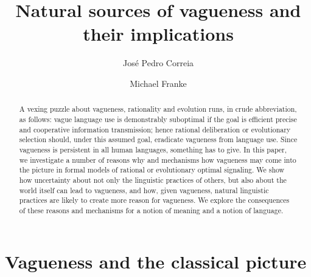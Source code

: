 \documentclass[a4paper]{article}
\begin{document}
\title{Natural sources of vagueness and their implications}
\author{Jos\'e Pedro Correia \and Michael Franke}
\date{}

\maketitle

\begin{abstract}
A vexing puzzle about vagueness, rationality and evolution runs, in crude abbreviation, as follows: vague language use is demonstrably suboptimal if the goal is efficient precise and cooperative information transmission; hence rational deliberation or evolutionary selection should, under this assumed goal, eradicate vagueness from language use.
Since vagueness is persistent in all human languages, something has to give.
In this paper, we investigate a number of reasons why and mechanisms how vagueness may come into the picture in formal models of rational or evolutionary optimal signaling.
We show how uncertainty about not only the linguistic practices of others, but also about the world itself can lead to vagueness, and how, given vagueness, natural linguistic practices are likely to create more reason for vagueness.
We explore the consequences of these reasons and mechanisms for a notion of meaning and a notion of language.
\end{abstract}

\tableofcontents

\section{Vagueness and the classical picture}
\label{sec:vagueness}
\end{document}
